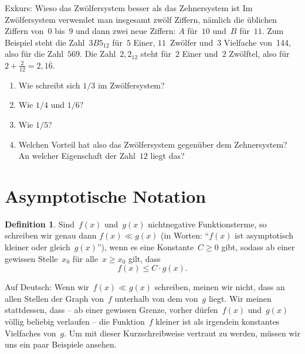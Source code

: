 \documentclass[twoside]{../zirkelblatt1415}
\theoremstyle{definition}
\newtheorem{defn}{Definition}[section]
\theoremstyle{plain}
\theoremstyle{remark}
\begin{document}
\begin{aufgabe}{Exkurs: Wieso das Zwölfersystem besser als das Zehnersystem ist}
Im Zwölfersystem verwendet man insgesamt zwölf Ziffern, nämlich die üblichen
Ziffern von~$0$ bis~$9$ und dann zwei neue Ziffern: $A$ für~$10$ und~$B$
für~$11$. Zum Beispiel steht die Zahl~$3B5_{12}$ für~$5$ Einer, $11$~Zwölfer
und~$3$ Vielfache von~144, also für die Zahl~$569$. Die Zahl~$2{,}2_{12}$ steht
für~$2$ Einer und~$2$ Zwölftel, also für~$2 + \frac{2}{12} =
2{,}1\overline{6}$.
\begin{enumerate}
\item Wie schreibt sich $1/3$ im Zwölfersystem?
\item Wie $1/4$ und $1/6$?
\item Wie $1/5$?
\item Welchen Vorteil hat also das Zwölfersystem gegenüber dem Zehnersystem? An
welcher Eigenschaft der Zahl~$12$ liegt das?
\end{enumerate}\fixlistspacing
\end{aufgabe}


\section{Asymptotische Notation}

\begin{defn}Sind~$f(x)$ und~$g(x)$ nichtnegative Funktionsterme, so schreiben
wir genau dann $f(x) \ll g(x)$ (in Worten: "`$f(x)$ ist asymptotisch kleiner
oder gleich~$g(x)$"'), wenn es eine Konstante~$C \geq 0$ gibt, sodass ab einer
gewissen Stelle~$x_0$ für alle~$x \geq x_0$ gilt, dass
\[ f(x) \leq C \cdot g(x). \]
\end{defn}

Auf Deutsch: Wenn wir~$f(x) \ll g(x)$ schreiben, meinen wir nicht, dass an
allen Stellen der Graph von~$f$ unterhalb von dem von~$g$ liegt. Wir meinen
stattdessen, dass -- ab einer gewissen Grenze, vorher dürfen~$f(x)$ und~$g(x)$
völlig beliebig verlaufen -- die Funktion~$f$ kleiner ist als irgendein
konstantes Vielfaches von~$g$. Um mit dieser Kurzschreibweise vertraut zu
werden, müssen wir uns ein paar Beispiele ansehen.
\end{document}
